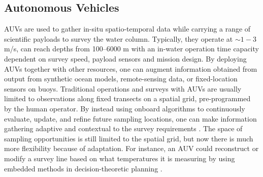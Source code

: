 \documentclass[aoas]{imsart}
\begin{document}
\subsection{Autonomous Vehicles}

AUVs are used to gather in-situ spatio-temporal data while carrying a
range of scientific payloads to survey the water column. Typically,
they operate at $\sim 1-3$ m/s, can reach depths from 100--6000 m with
an in-water operation time capacity dependent on survey speed, payload
sensors and mission design. By deploying AUVs together with other
resources, one can augment information obtained from output from synthetic ocean models,
remote-sensing data, or fixed-location sensors on buoys. Traditional
operations and surveys with AUVs are usually limited to observations
along fixed transects on a spatial grid, pre-programmed by the human
operator. By instead using onboard algorithms to continuously
evaluate, update, and refine future sampling locations, one can make
information gathering adaptive and contextual to the survey
requirements \citep{das11b,fossum18b,fossuminformation}. The space of
sampling opportunities is still limited to the spatial grid, but now
there is much more flexibility because of adaptation. For instance, an
AUV could reconstruct or modify a survey line based on what
temperatures it is measuring by using embedded methods in
decision-theoretic planning \citep{py10,Rajan12,Rajan12b}.


\end{document}

